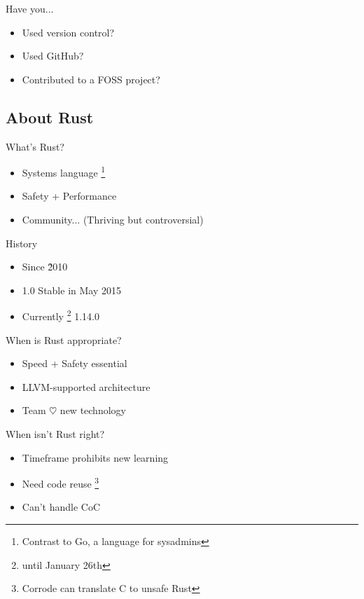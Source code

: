 \documentclass[xcolor={svgnames},hyperref]{beamer}
\begin{document}
    \begin{frame}
        Have you...
        \begin{itemize}
            \item Used version control?
            \item Used GitHub?
            \item Contributed to a FOSS project?
        \end{itemize}
    \end{frame}



    \subsection{About Rust}

    \begin{frame}
        What's Rust?
        \begin{itemize}
            \item Systems language \footnote{Contrast to Go, a language for sysadmins}
            \item Safety + Performance
            \item Community... (Thriving but controversial)
        \end{itemize}
    \end{frame}

    \begin{frame}
        History
        \begin{itemize}
            \item Since \~2010
            \item 1.0 Stable in May 2015
            \item Currently \footnote{until January 26th} 1.14.0
        \end{itemize}
    \end{frame}

    \begin{frame}
        When is Rust appropriate?
        \begin{itemize}
            \item Speed + Safety essential
            \item LLVM-supported architecture
            \item Team $\heartsuit$ new technology
        \end{itemize}
    \end{frame}


    \begin{frame}
        When isn't Rust right?
        \begin{itemize}
            \item Timeframe prohibits new learning
            \item Need code reuse \footnote{Corrode can translate C to unsafe Rust}
            \item Can't handle CoC
        \end{itemize}
    \end{frame}
\end{document}
